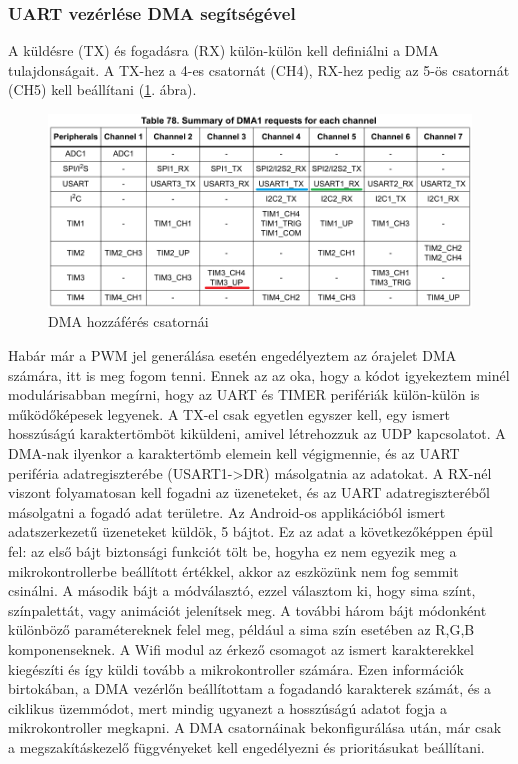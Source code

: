 \documentclass[../main.tex]{subfiles}
\begin{document}
        \subsubsection{UART vezérlése DMA segítségével}
            A küldésre (TX) és fogadásra (RX) külön-külön kell definiálni a DMA tulajdonságait. A TX-hez a 4-es csatornát (CH4), RX-hez pedig az 5-ös csatornát (CH5) kell beállítani (\ref{fig:dma_request}. ábra).
            \begin{figure}[h!]
                \centering
                    \includegraphics[width=12cm]{mbed_res/dma_requests}
                \caption{DMA hozzáférés csatornái \cite{rm0008}}
                \label{fig:dma_request}
            \end{figure}
            
            Habár már a PWM jel generálása esetén engedélyeztem az órajelet DMA számára, itt is meg fogom tenni. Ennek az az oka, hogy a kódot igyekeztem minél modulárisabban megírni, hogy az UART és TIMER perifériák külön-külön is működőképesek legyenek. A TX-el csak egyetlen egyszer kell, egy ismert hosszúságú karaktertömböt kiküldeni, amivel létrehozzuk az UDP kapcsolatot. A DMA-nak ilyenkor a karaktertömb elemein kell végigmennie, és az UART periféria adatregiszterébe (USART1->DR) másolgatnia az adatokat. A RX-nél viszont folyamatosan kell fogadni az üzeneteket, és az UART adatregiszteréből másolgatni a fogadó adat területre. Az Android-os applikációból ismert adatszerkezetű üzeneteket küldök, 5 bájtot. Ez az adat a következőképpen épül fel: az első bájt biztonsági funkciót tölt be, hogyha ez nem egyezik meg a mikrokontrollerbe beállított értékkel, akkor az eszközünk nem fog semmit csinálni. A második bájt a módválasztó, ezzel választom ki, hogy sima színt, színpalettát, vagy animációt jelenítsek meg. A további három bájt módonként különböző paramétereknek felel meg, például a sima szín esetében az R,G,B komponenseknek. A Wifi modul az érkező csomagot az ismert karakterekkel kiegészíti és így küldi tovább a mikrokontroller számára. Ezen információk birtokában, a DMA vezérlőn beállítottam a fogadandó karakterek számát, és a ciklikus üzemmódot, mert mindig ugyanezt a hosszúságú adatot fogja a mikrokontroller megkapni. A DMA csatornáinak bekonfigurálása után, már csak a megszakításkezelő függvényeket kell engedélyezni és prioritásukat beállítani.
            
\end{document}
